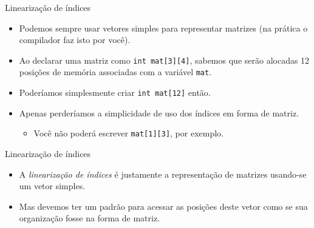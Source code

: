 \documentclass[handout]{beamer}
\newcommand{\cod}[1]{\texttt{#1}}
\begin{document}
\begin{frame}[fragile]{Linearização de índices}

    \begin{itemize}
        \item Podemos sempre usar vetores simples para representar matrizes (na prática o compilador faz isto por você).
        \item Ao declarar uma matriz como \cod{int mat[3][4]}, sabemos que serão alocadas 12 posições de memória associadas com a variável \cod{mat}.
        \item Poderíamos simplesmente criar \cod{int mat[12]} então.
        \item Apenas perderíamos a simplicidade de uso dos índices em forma de matriz.
        \begin{itemize}
            \item Você não poderá escrever \cod{mat[1][3]}, por exemplo.
        \end{itemize}
    \end{itemize}

\end{frame}

\begin{frame}[fragile]{Linearização de índices}

    \begin{itemize}
        \item A {\it linearização de índices} é justamente a representação de matrizes usando-se um vetor simples.
        \item Mas devemos ter um padrão para acessar as posições deste vetor como se sua organização fosse na forma de matriz.
    \end{itemize}

\end{frame}
\end{document}
